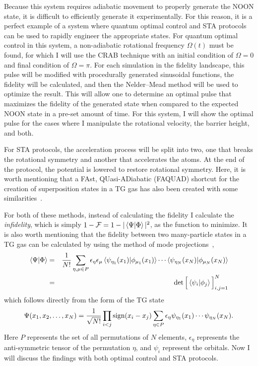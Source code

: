Because this system requires adiabatic movement to properly generate the NOON state, it is difficult to efficiently generate it experimentally.
For this reason, it is a perfect example of a system where quantum optimal control and STA protocols can be used to rapidly engineer the appropriate states.
For quantum optimal control in this system, a non-adiabatic rotational frequency $\Omega(t)$ must be found, for which I will use the CRAB technique with an initial condition of $\Omega = 0$ and final condition of $\Omega = \pi$.
For each simulation in the fidelity landscape, this pulse will be modified with procedurally generated sinusoidal functions, the fidelity will be calculated, and then the Nelder--Mead method will be used to optimize the result.
This will allow one to determine an optimal pulse that maximizes the fidelity of the generated state when compared to the expected NOON state in a pre-set amount of time.
For this system, I will show the optimal pulse for the cases where I manipulate the rotational velocity, the barrier height, and both.

For STA protocols, the acceleration process will be split into two, one that breaks the rotational symmetry and another that accelerates the atoms.
At the end of the protocol, the potential is lowered to restore rotational symmetry.
Here, it is worth mentioning that a FAst, QUasi-ADiabatic (FAQUAD) shortcut for the creation of superposition states in a TG gas has also been created with some similarities~\cite{garaot2015}.

For both of these methods, instead of calculating the fidelity I calculate the \textit{infidelity}, which is simply $1-\mathcal{F} = 1-|\braket{\Psi|\Phi}|^2$, as the function to minimize.
It is also worth mentioning that the fidelity between two many-particle states in a TG gas can be calculated by using the method of mode projections~\cite{campo2011,lelas2011},
\begin{eqnarray}
\braket{\Psi | \Phi} &=& \frac1{N!} \sum_{\eta, \mu \in P} \epsilon_\eta \epsilon_\mu \braket{\psi_{\eta_1}(x_1) | \phi_{\mu_1}(x_1) } \cdots \braket{ \psi_{\eta_N}(x_N) | \phi_{\mu_N}(x_N) } \nonumber \\
\label{eq:fid}
&=&
\det \Big[ \braket{\psi_i | \phi_j }\Big]_{i,j=1}^N
\end{eqnarray}
which follows directly from the form of the TG state~\cite{girardeau1960}
\begin{equation}
\Psi(x_1,x_2,\ldots, x_N)= \frac1{\sqrt{N!}} \prod_{i<j}\textnormal{sign}(x_i-x_j) \sum_{\eta \in P} \epsilon_\eta \psi_{\eta_1}(x_1)\cdots\psi_{\eta_N}(x_N).
\label{eq:TG}
\end{equation}
Here $P$ represents the set of all permutations of $N$ elements, $\epsilon_\eta$ represents the anti-symmetric tensor of the permutation $\eta$, and $\psi_i$ represent the orbitals.
Now I will discuss the findings with both optimal control and STA protocols.


